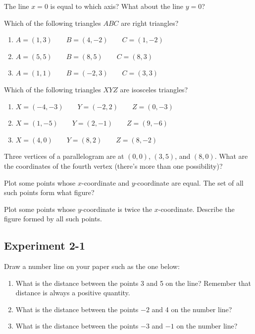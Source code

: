 \documentclass[12pt]{book} %
\begin{document}
\begin{ExerciseList}
	\Exercise The line $x=0$ is equal to which axis? What about the line $y=0$?
	
	\Exercise Which of the following triangles $ABC$ are right triangles?
	\begin{enumerate}
		\item[(a)] $A=(1,3)\qquad B=(4,-2)\qquad C=(1,-2)$
		\item[(b)] $A=(5,5)\qquad B=(8,5)\qquad C=(8,3)$
		\item[(c)] $A=(1,1)\qquad B=(-2,3)\qquad C=(3,3)$
	\end{enumerate}
	
	\Exercise Which of the following triangles $XYZ$ are isosceles triangles?
	\begin{enumerate}
		\item[(a)] $X=(-4,-3)\qquad Y=(-2,2)\qquad Z=(0,-3)$
		\item[(b)] $X=(1,-5)\qquad Y=(2,-1)\qquad Z=(9,-6)$
		\item[(c)] $X=(4,0)\qquad Y=(8,2)\qquad Z=(8,-2)$
	\end{enumerate}
	
	\Exercise Three vertices of a parallelogram are at $(0,0)$, $(3,5)$, and $(8,0)$. What are the coordinates of the fourth vertex (there's more than one possibility)?
	
	\Exercise Plot some points whose $x$-coordinate and $y$-coordinate are equal. The set of all such points form what figure?
	
	\Exercise Plot some points whose $y$-coordinate is twice the $x$-coordinate. Describe the figure formed by all such points.
\end{ExerciseList}

\subsection*{Experiment 2-1}

Draw a number line on your paper such as the one below:

\begin{center}
\end{center}

\begin{enumerate}
	\item What is the distance between the points 3 and 5 on the line? Remember that distance is always a positive quantity.
	
	\item What is the distance between the points $-2$ and 4 on the number line?
	
	\item What is the distance between the points $-3$ and $-1$ on the number line?
\end{enumerate}
\end{document}
